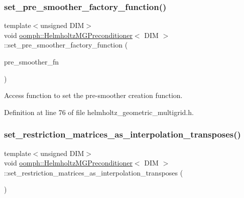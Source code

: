 \subsubsection{\texorpdfstring{set\+\_\+pre\+\_\+smoother\+\_\+factory\+\_\+function()}{set\_pre\_smoother\_factory\_function()}}
{\footnotesize\ttfamily template$<$unsigned D\+IM$>$ \\
void \hyperlink{classoomph_1_1HelmholtzMGPreconditioner}{oomph\+::\+Helmholtz\+M\+G\+Preconditioner}$<$ D\+IM $>$\+::set\+\_\+pre\+\_\+smoother\+\_\+factory\+\_\+function (\begin{DoxyParamCaption}\item[{\hyperlink{classoomph_1_1HelmholtzMGPreconditioner_ac17ab35f36cad29ce8f1e64593c90a95}{Pre\+Smoother\+Factory\+Fct\+Pt}}]{pre\+\_\+smoother\+\_\+fn }\end{DoxyParamCaption})\hspace{0.3cm}{\ttfamily [inline]}}



Access function to set the pre-\/smoother creation function. 



Definition at line 76 of file helmholtz\+\_\+geometric\+\_\+multigrid.\+h.

\mbox{\label{classoomph_1_1HelmholtzMGPreconditioner_a9199207c647475375acd63944e28fdf2}} 
\subsubsection{\texorpdfstring{set\+\_\+restriction\+\_\+matrices\+\_\+as\+\_\+interpolation\+\_\+transposes()}{set\_restriction\_matrices\_as\_interpolation\_transposes()}}
{\footnotesize\ttfamily template$<$unsigned D\+IM$>$ \\
void \hyperlink{classoomph_1_1HelmholtzMGPreconditioner}{oomph\+::\+Helmholtz\+M\+G\+Preconditioner}$<$ D\+IM $>$\+::set\+\_\+restriction\+\_\+matrices\+\_\+as\+\_\+interpolation\+\_\+transposes (\begin{DoxyParamCaption}{ }\end{DoxyParamCaption})\hspace{0.3cm}{\ttfamily [inline]}}



